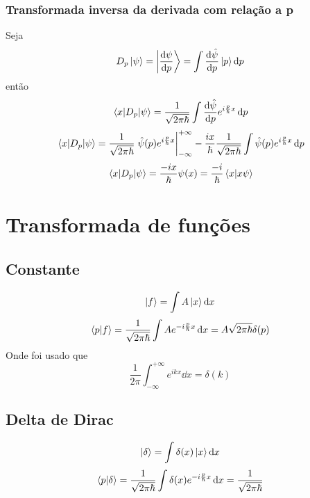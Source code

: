 \documentclass[report,14pt,openright,oneside,a4paper,brazil]{abntex2}
\newcommand{\abrir}[2]{\int{#1}\ket{#2}\dd{#2}}
\newcommand{\qfourier}[1]{\frac{1}{\sqrt{2\pi\hbar}}\int{#1} e^{-i \frac{p}{\hbar} x} \dd{x}}
\newcommand{\aqfourier}[1]{\frac{1}{\sqrt{2\pi\hbar}}\int{#1} e^{i \frac{p}{\hbar} x} \dd{p}}
\begin{document}
\subsection{Transformada inversa da derivada com relação a p}

Seja
\begin{equation}
    D_p\ket{\psi}=\ket{\dv{\psi}{p}}= \abrir{\dv{\hat{\psi}}{p} (p)}{p}
\end{equation}
então
\begin{equation}
    \matrixel{x}{D_p}{\psi}= \aqfourier{\dv{\hat\psi}{p} (p)}
\end{equation}
\begin{equation}
    \matrixel{x}{D_p}{\psi}= \frac{1}{\sqrt{2\pi \hbar}}\eval{\hat\psi(p)e^{i\frac{p}{\hbar}x}}_{-\infty}^{+\infty}- \frac{ix}{\hbar} \aqfourier{\hat\psi(p)}
\end{equation}
\begin{equation}
    \matrixel{x}{D_p}{\psi}= \frac{-ix}{\hbar} \psi(x)=\frac{-i}{\hbar} \braket{x}{x\psi}
\end{equation}

\chapter{Transformada de funções}

\section{Constante}
\begin{equation}
    \ket{f}=\abrir{A}{x}
\end{equation}
\begin{equation}
        \braket{p}{f}=\qfourier{A}
        =A\sqrt{2\pi\hbar}\delta (p)
\end{equation}
Onde foi usado que
\begin{equation}
    \frac{1}{2\pi} \int_{-\infty}^{+\infty}{e^{ikx}} \dd{x} = \delta (k)
\end{equation}

\section{Delta de Dirac}

\begin{equation}
	\ket{\delta} = \abrir{\delta(x)}{x}
\end{equation}
\begin{equation}
	\braket{p}{\delta}=\qfourier{\delta (x)}=\frac{1}{\sqrt{2\pi\hbar}}
\end{equation}
\end{document}
